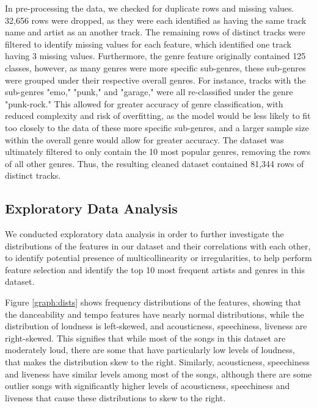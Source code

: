 \documentclass[times, twocolumn]{article}
\begin{document}
In pre-processing the data, we checked for duplicate rows and missing values. 32,656 rows were dropped, as they were each identified as having the same track name and artist as an another track. The remaining rows of distinct tracks were filtered to identify missing values for each feature, which identified one track having 3 missing values. Furthermore, the genre feature originally contained 125 classes, however, as many genres were more specific sub-genres, these sub-genres were grouped under their respective overall genres. For instance, tracks with the sub-genres "emo," "punk," and "garage," were all re-classified under the genre "punk-rock." This allowed for greater accuracy of genre classification, with reduced complexity and risk of overfitting, as the model would be less likely to fit too closely to the data of these more specific sub-genres, and a larger sample size within the overall genre would allow for greater accuracy. The dataset was ultimately filtered to only contain the 10 most popular genres, removing the rows of all other genres. Thus, the resulting cleaned dataset contained 81,344 rows of distinct tracks.

\subsection{Exploratory Data Analysis}
We conducted exploratory data analysis in order to further investigate the distributions of the features in our dataset and their correlations with each other, to identify potential presence of multicollinearity or irregularities, to help perform feature selection and identify the top 10 most frequent artists and genres in this dataset.

Figure \ref{graph:dists} shows frequency distributions of the features, showing that the danceability and tempo features have nearly normal distributions, while the distribution of loudness is left-skewed, and acousticness, speechiness, liveness are right-skewed. This signifies that while most of the songs in this dataset are moderately loud, there are some that have particularly low levels of loudness, that makes the distribution skew to the right. Similarly, acousticness, speechiness and liveness have similar levels among most of the songs, although there are some outlier songs with significantly higher levels of acousticness, speechiness and liveness that cause these distributions to skew to the right.
\end{document}
